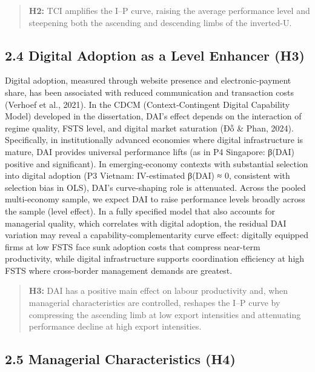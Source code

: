 \documentclass[
  12pt]{article}
\begin{document}
\begin{quote}
\textbf{H2:} TCI amplifies the I--P curve, raising the average
performance level and steepening both the ascending and descending limbs
of the inverted-U.
\end{quote}

\hypertarget{digital-adoption-as-a-level-enhancer-h3}{%
\subsection{2.4 Digital Adoption as a Level Enhancer
(H3)}\label{digital-adoption-as-a-level-enhancer-h3}}

Digital adoption, measured through website presence and
electronic-payment share, has been associated with reduced communication
and transaction costs (Verhoef et al., 2021). In the CDCM
(Context-Contingent Digital Capability Model) developed in the
dissertation, DAI's effect depends on the interaction of regime quality,
FSTS level, and digital market saturation (Đỗ \& Phan, 2024).
Specifically, in institutionally advanced economies where digital
infrastructure is mature, DAI provides universal performance lifts (as
in P4 Singapore: β(DAI) positive and significant). In emerging-economy
contexts with substantial selection into digital adoption (P3 Vietnam:
IV-estimated β(DAI) ≈ 0, consistent with selection bias in OLS), DAI's
curve-shaping role is attenuated. Across the pooled multi-economy
sample, we expect DAI to raise performance levels broadly across the
sample (level effect). In a fully specified model that also accounts for
managerial quality, which correlates with digital adoption, the residual
DAI variation may reveal a capability-complementarity curve effect:
digitally equipped firms at low FSTS face sunk adoption costs that
compress near-term productivity, while digital infrastructure supports
coordination efficiency at high FSTS where cross-border management
demands are greatest.

\begin{quote}
\textbf{H3:} DAI has a positive main effect on labour productivity and,
when managerial characteristics are controlled, reshapes the I--P curve
by compressing the ascending limb at low export intensities and
attenuating performance decline at high export intensities.
\end{quote}

\hypertarget{managerial-characteristics-h4}{%
\subsection{2.5 Managerial Characteristics
(H4)}\label{managerial-characteristics-h4}}
\end{document}
